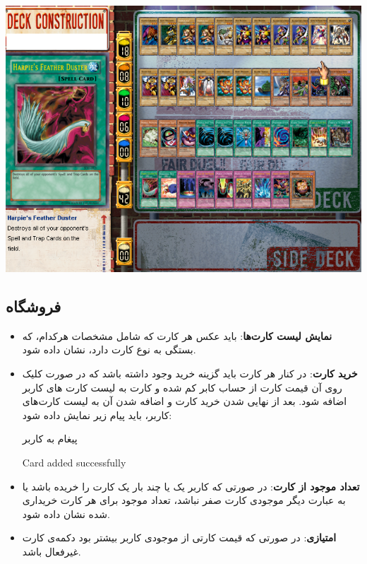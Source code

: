 \documentclass[]{article}
\begin{document}
\begin{center}
	\includegraphics[width = 0.75 \textwidth]{images/1.png}
	
\end{center}

\subsection*{{\titr فروشگاه}}

\begin{itemize}
    \item \textbf{نمایش لیست کارت‌ها}:
     باید عکس هر کارت که شامل مشخصات هر‌کدام، که بستگی به نوع کارت دارد، نشان داده شود.
     
    \item \textbf{خرید کارت}:
     در کنار هر کارت باید گزینه خرید وجود داشته باشد که در صورت کلیک روی آن قیمت کارت از حساب کابر کم شده و کارت به لیست کارت های کاربر اضافه شود. بعد از نهایی شدن خرید کارت و اضافه شدن آن به لیست کارت‌های کاربر، باید پیام زیر نمایش داده شود:
     
     
    
     
     \begin{mybox}[colback=yellow]{پیغام به کاربر}
     	\begin{latin}	
     		Card added successfully
     	\end{latin}
     \end{mybox}
     
    \item \textbf{تعداد موجود از کارت}:
     در صورتی که کاربر یک یا چند بار یک کارت را خریده باشد یا به عبارت دیگر موجودی کارت صفر نباشد، تعداد موجود برای هر کارت خریداری شده نشان داده شود.
     
    \item \textbf{امتیازی}: در صورتی که قیمت کارتی از موجودی کاربر بیشتر بود دکمه‌ی  کارت غیر‌فعال باشد.
\end{itemize}
\end{document}
